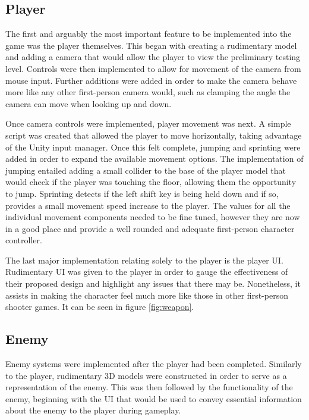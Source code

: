 \documentclass[11pt]{article}
\begin{document}
\subsection{Player}
The first and arguably the most important feature to be implemented into the game was the player
themselves. This began with creating a rudimentary model and adding a camera that would allow the
player to view the preliminary testing level. Controls were then implemented to allow for movement
of the camera from mouse input. Further additions were added in order to make the camera behave
more like any other first-person camera would, such as clamping the angle the camera can move when
looking up and down. 

Once camera controls were implemented, player movement was next. A simple script was created that
allowed the player to move horizontally, taking advantage of the Unity input manager. Once this
felt complete, jumping and sprinting were added in order to expand the available movement options.
The implementation of jumping entailed adding a small collider to the base of the player model that
would check if the player was touching the floor, allowing them the opportunity to jump. Sprinting
detects if the left shift key is being held down and if so, provides a small movement speed
increase to the player. The values for all the individual movement components needed to be fine
tuned, however they are now in a good place and provide a well rounded and adequate first-person
character controller. 

The last major implementation relating solely to the player is the player UI. Rudimentary UI was
given to the player in order to gauge the effectiveness of their proposed design and highlight any
issues that there may be. Nonetheless, it assists in making the character feel much more like those
in other first-person shooter games. It can be seen in figure \ref{fig:weapon}. \\

\subsection{Enemy}
Enemy systems were implemented after the player had been completed. Similarly to the player,
rudimentary 3D models were constructed in order to serve as a representation of the enemy. This was
then followed by the functionality of the enemy, beginning with the UI that would be used to convey
essential information about the enemy to the player during gameplay. 
\end{document}

